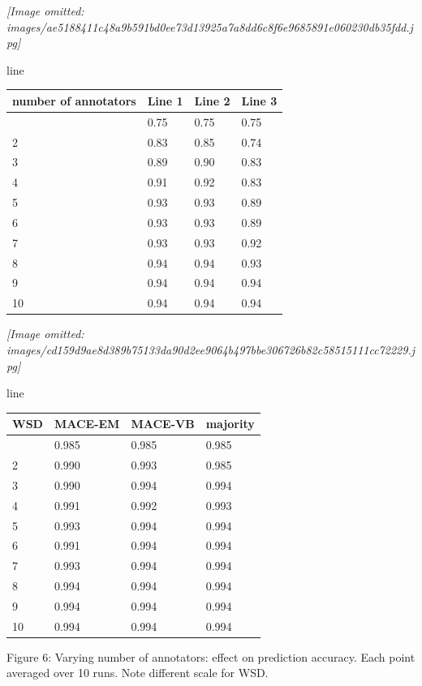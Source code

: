 \documentclass[
]{article}
\newcounter{none} %
\begin{document}
\textit{[Image omitted: images/ae5188411c48a9b591bd0ee73d13925a7a8dd6c8f6e9685891e060230db35fdd.jpg]}

line

{\def\LTcaptype{none} %
\begin{longtable}[]{@{}llll@{}}
\toprule\noalign{}
number of annotators & Line 1 & Line 2 & Line 3 \\
\midrule\noalign{}
\endhead
\bottomrule\noalign{}
\endlastfoot
1 & 0.75 & 0.75 & 0.75 \\
2 & 0.83 & 0.85 & 0.74 \\
3 & 0.89 & 0.90 & 0.83 \\
4 & 0.91 & 0.92 & 0.83 \\
5 & 0.93 & 0.93 & 0.89 \\
6 & 0.93 & 0.93 & 0.89 \\
7 & 0.93 & 0.93 & 0.92 \\
8 & 0.94 & 0.94 & 0.93 \\
9 & 0.94 & 0.94 & 0.94 \\
10 & 0.94 & 0.94 & 0.94 \\
\end{longtable}
}

\textit{[Image omitted: images/cd159d9ae8d389b75133da90d2ee9064b497bbe306726b82c58515111cc72229.jpg]}

line

{\def\LTcaptype{none} %
\begin{longtable}[]{@{}llll@{}}
\toprule\noalign{}
WSD & MACE-EM & MACE-VB & majority \\
\midrule\noalign{}
\endhead
\bottomrule\noalign{}
\endlastfoot
1 & 0.985 & 0.985 & 0.985 \\
2 & 0.990 & 0.993 & 0.985 \\
3 & 0.990 & 0.994 & 0.994 \\
4 & 0.991 & 0.992 & 0.993 \\
5 & 0.993 & 0.994 & 0.994 \\
6 & 0.991 & 0.994 & 0.994 \\
7 & 0.993 & 0.994 & 0.994 \\
8 & 0.994 & 0.994 & 0.994 \\
9 & 0.994 & 0.994 & 0.994 \\
10 & 0.994 & 0.994 & 0.994 \\
\end{longtable}
}

Figure 6: Varying number of annotators: effect on prediction accuracy.
Each point averaged over 10 runs. Note different scale for WSD.
\end{document}
